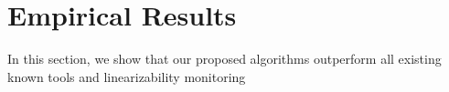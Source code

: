 
\section{Empirical Results}

In this section, we show that our proposed algorithms outperform all existing known tools and linearizability monitoring